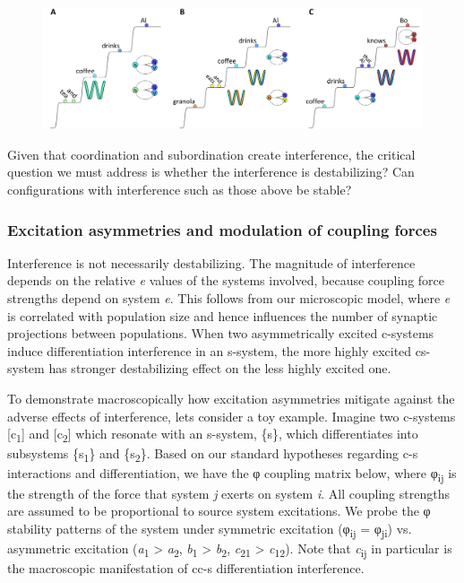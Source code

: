   
\begin{figure}
\includegraphics[width=\textwidth]{figures/Tilsen-img94.png}
\caption{\missingcaption}
\label{fig:}
\end{figure}
 

  Given that coordination and subordination create interference, the critical question we must address is whether the interference is destabilizing? Can configurations with interference such as those above be stable? 

\subsubsection{Excitation asymmetries and modulation of coupling forces}

Interference is not necessarily destabilizing. The magnitude of interference depends on the relative \textit{e} values of the systems involved, because coupling force strengths depend on system \textit{e}. This follows from our microscopic model, where \textit{e} is correlated with population size and hence influences the number of synaptic projections between populations. When two asymmetrically excited c-systems induce differentiation interference in an s-system, the more highly excited cs-system has stronger destabilizing effect on the less highly excited one.

  To demonstrate macroscopically how excitation asymmetries mitigate against the adverse effects of interference, lets consider a toy example. Imagine two c-systems [c\textsubscript{1}] and [c\textsubscript{2}] which resonate with an s-system, \{s\}, which differentiates into subsystems \{s\textsubscript{1}\} and \{s\textsubscript{2}\}. Based on our standard hypotheses regarding c-s interactions and differentiation, we have the φ coupling matrix below, where φ\textsubscript{ij} is the strength of the force that system \textit{j} exerts on system \textit{i}. All coupling strengths are assumed to be proportional to source system excitations. We probe the φ stability patterns of the system under symmetric excitation (φ\textsubscript{ij} = φ\textsubscript{ji}) vs. asymmetric excitation (\textit{a}\textsubscript{1} > \textit{a}\textsubscript{2}, \textit{b}\textsubscript{1} > \textit{b}\textsubscript{2}, \textit{c}\textsubscript{21} > \textit{c}\textsubscript{12}). Note that \textit{c}\textsubscript{ij} in particular is the macroscopic manifestation of cc-s differentiation interference.

